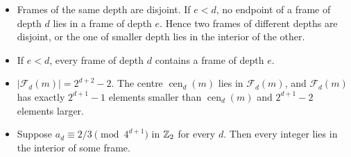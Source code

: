 \begin{lemma}[Frames]\label{fam:frames}
\begin{itemize}
\item[(a)] Frames of the same depth are disjoint. If $e<d$, no endpoint of a frame of depth $d$ lies in a frame of depth $e$. Hence two frames of different depths are disjoint, or the one of smaller depth lies in the interior of the other.
\item[(b)] If $e<d$, every frame of depth $d$ contains a frame of depth $e$.
\item[(c)] $|\mathcal F_d(m)|=2^{d+2}-2$. The centre $\operatorname{cen}_d(m)$ lies in $\mathcal F_d(m)$, and $\mathcal F_d(m)$ has exactly $2^{d+1}-1$ elements smaller than $\operatorname{cen}_d(m)$ and $2^{d+1}-2$ elements larger.
\item[(d)] Suppose $a_d\equiv2/3\pmod{4^{d+1}}$ in $\mathbb{Z}_2$ for every $d$. Then every integer lies in the interior of some frame.
\end{itemize}
\end{lemma}

